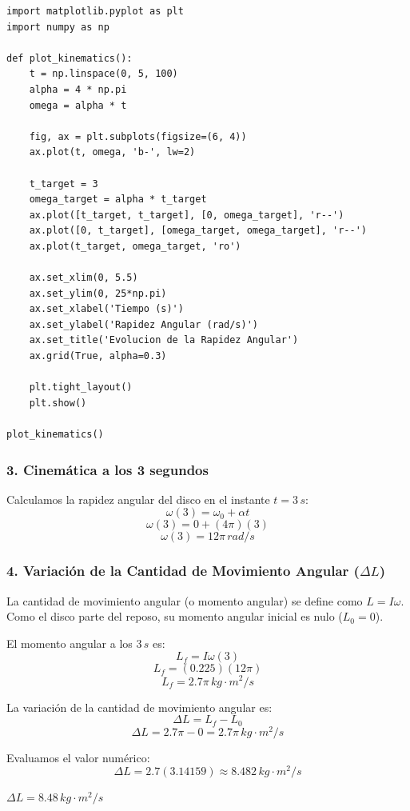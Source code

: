 \documentclass[12pt, a4paper]{article}
\begin{document}
\begin{lstlisting}
import matplotlib.pyplot as plt
import numpy as np

def plot_kinematics():
    t = np.linspace(0, 5, 100)
    alpha = 4 * np.pi
    omega = alpha * t
    
    fig, ax = plt.subplots(figsize=(6, 4))
    ax.plot(t, omega, 'b-', lw=2)
    
    t_target = 3
    omega_target = alpha * t_target
    ax.plot([t_target, t_target], [0, omega_target], 'r--')
    ax.plot([0, t_target], [omega_target, omega_target], 'r--')
    ax.plot(t_target, omega_target, 'ro')
    
    ax.set_xlim(0, 5.5)
    ax.set_ylim(0, 25*np.pi)
    ax.set_xlabel('Tiempo (s)')
    ax.set_ylabel('Rapidez Angular (rad/s)')
    ax.set_title('Evolucion de la Rapidez Angular')
    ax.grid(True, alpha=0.3)
    
    plt.tight_layout()
    plt.show()

plot_kinematics()
\end{lstlisting}

\subsubsection*{3. Cinemática a los 3 segundos}
Calculamos la rapidez angular del disco en el instante $t = 3 \, \si{s}$:
$$\omega(3) = \omega_0 + \alpha t$$
$$\omega(3) = 0 + (4\pi)(3)$$
$$\omega(3) = 12\pi \, \si{rad/s}$$

\subsubsection*{4. Variación de la Cantidad de Movimiento Angular ($\Delta L$)}
La cantidad de movimiento angular (o momento angular) se define como $L = I \omega$.
Como el disco parte del reposo, su momento angular inicial es nulo ($L_0 = 0$).

El momento angular a los $3 \, \si{s}$ es:
$$L_f = I \omega(3)$$
$$L_f = (0.225) (12\pi)$$
$$L_f = 2.7\pi \, \si{kg\cdot m^2/s}$$

La variación de la cantidad de movimiento angular es:
$$\Delta L = L_f - L_0$$
$$\Delta L = 2.7\pi - 0 = 2.7\pi \, \si{kg\cdot m^2/s}$$

Evaluamos el valor numérico:
$$\Delta L = 2.7 (3.14159) \approx 8.482 \, \si{kg\cdot m^2/s}$$

\begin{tcolorbox}[colback=green!5!white, colframe=green!50!black, title=Respuesta Final]
\centering \Large $\Delta L = 8.48 \, \si{kg\cdot m^2/s}$
\end{tcolorbox}
\end{document}
